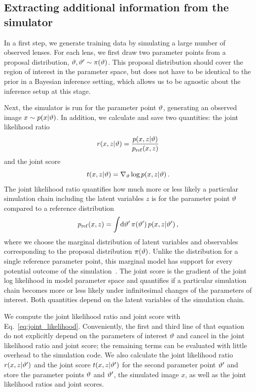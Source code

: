 \documentclass[twocolumn]{aastex62}
\begin{document}
\subsection{Extracting additional information from the simulator}
\label{sec:lfi-gold}

In a first step, we generate training data by simulating a large number of observed lenses. For each lens, we first draw two parameter points from a proposal distribution, $\vartheta, \vartheta' \sim \pi(\vartheta)$. This proposal distribution should cover the region of interest in the parameter space, but does not have to be identical to the prior in a Bayesian inference setting, which allows us to be agnostic about the inference setup at this stage.

Next, the simulator is run for the parameter point $\vartheta$, generating an observed image $x \sim p(x|\vartheta)$. In addition, we calculate and save two quantities: the joint likelihood ratio
%
\begin{equation}
  r(x,z | \stattheta) = \frac {p(x,z | \stattheta)} {p_\mathrm{ref}(x,z)}
\end{equation}
%
and the joint score
%
\begin{equation}
  t(x, z | \stattheta) = \nabla_{\stattheta} \log p(x,z | \stattheta) \,.
\end{equation}
%
The joint likelihood ratio quantifies how much more or less likely a particular simulation chain including the latent variables $z$ is for the parameter point $\vartheta$ compared to a reference distribution
%
\begin{equation}
  \pref(x,z) = \int\!\diff\stattheta' \, \pi(\stattheta') \, p(x,z | \stattheta') \,,
\end{equation}
%
where we choose the marginal distribution of latent variables and observables corresponding to the proposal distribution $\pi(\vartheta)$. Unlike the distribution for a single reference parameter point, this marginal model has support for every potential outcome of the simulation~\citep{Hermans:2019ioj}. The joint score is the gradient of the joint log likelihood in model parameter space and quantifies if a particular simulation chain becomes more or less likely under infinitesimal changes of the parameters of interest. Both quantities depend on the latent variables of the simulation chain.

We compute the joint likelihood ratio and joint score with Eq.~\eqref{eq:joint_likelihood}. Conveniently, the first and third line of that equation do not explicitly depend on the parameters of interest $\vartheta$ and cancel in the joint likelihood ratio and joint score; the remaining terms can be evaluated with little overhead to the simulation code. We also calculate the joint likelihood ratio $r(x,z|\vartheta')$ and the joint score $t(x,z|\vartheta')$ for the second parameter point $\vartheta'$ and store the parameter points $\vartheta$ and $\vartheta'$, the simulated image $x$, as well as the joint likelihood ratios and joint scores.
\end{document}
